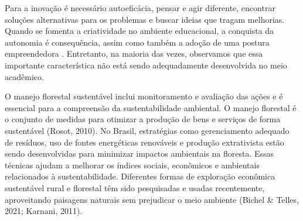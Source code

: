 Para a inovação é necessário autoeficácia, pensar e agir diferente, encontrar soluções alternativas para os problemas e buscar ideias que tragam melhorias. Quando se fomenta a criatividade no ambiente educacional, a conquista da autonomia é consequência, assim como também a adoção de uma postura empreendedora \cite{Gonzalez2009PredictorsClasses}. Entretanto, na maioria das vezes, observamos que essa importante característica não está sendo adequadamente desenvolvida no meio acadêmico. 




O manejo florestal sustentável inclui monitoramento e avaliação das ações e é essencial para a compreensão da sustentabilidade ambiental. O manejo florestal é o conjunto de medidas para otimizar a produção de bens e serviços de forma sustentável (Rosot, 2010). No Brasil, estratégias como gerenciamento adequado de resíduos, uso de fontes energéticas renováveis e produção extrativista estão sendo desenvolvidas para minimizar impactos ambientais na floresta. Essas técnicas ajudam a melhorar os índices sociais, econômicos e ambientais relacionados à sustentabilidade. Diferentes formas de exploração econômica sustentável rural e florestal têm sido pesquisadas e usadas recentemente, aproveitando paisagens naturais sem prejudicar o meio ambiente (Bichel & Telles, 2021; Karnani, 2011). 